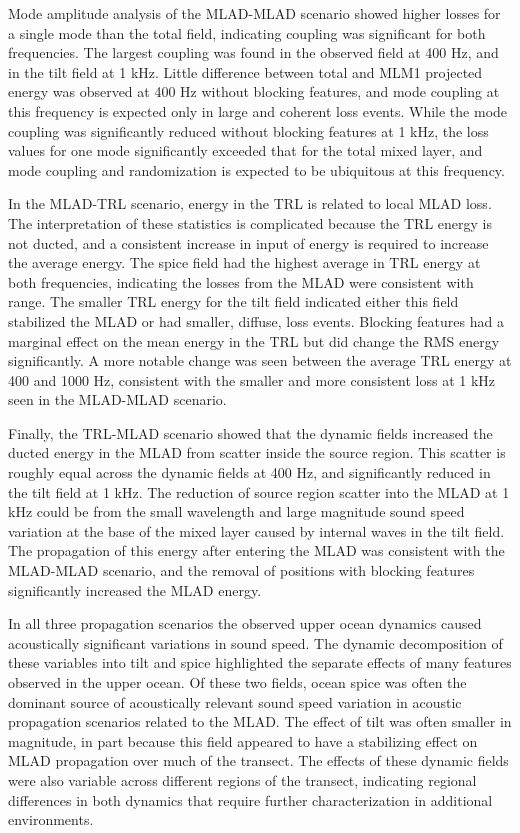 \documentclass[preprint,NumberedRefs]{JASA}
\begin{document}
Mode amplitude analysis of the MLAD-MLAD scenario showed higher losses for a single mode than the total field, indicating coupling was significant for both frequencies. The largest coupling was found in the observed field at 400 Hz, and in the tilt field at 1 kHz. Little difference between total and MLM1 projected energy was observed at 400 Hz without blocking features, and mode coupling at this frequency is expected only in large and coherent loss events. While the mode coupling was significantly reduced without blocking features at 1 kHz, the loss values for one mode significantly exceeded that for the total mixed layer, and mode coupling and randomization is expected to be ubiquitous at this frequency.

In the MLAD-TRL scenario, energy in the TRL is related to local MLAD loss. The interpretation of these statistics is complicated because the TRL energy is not ducted, and a consistent increase in input of energy is required to increase the average energy. The spice field had the highest average in TRL energy at both frequencies, indicating the losses from the MLAD were consistent with range. The smaller TRL energy for the tilt field indicated either this field stabilized the MLAD or had smaller, diffuse, loss events. Blocking features had a marginal effect on the mean energy in the TRL but did change the RMS energy significantly. A more notable change was seen between the average TRL energy at 400 and 1000 Hz, consistent with the smaller and more consistent loss at 1 kHz seen in the MLAD-MLAD scenario.

Finally, the TRL-MLAD scenario showed that the dynamic fields increased the ducted energy in the MLAD from scatter inside the source region. This scatter is roughly equal across the dynamic fields at 400 Hz, and significantly reduced in the tilt field at 1 kHz. The reduction of source region scatter into the MLAD at 1 kHz could be from the small wavelength and large magnitude sound speed variation at the base of the mixed layer caused by internal waves in the tilt field. The propagation of this energy after entering the MLAD was consistent with the MLAD-MLAD scenario, and the removal of positions with blocking features significantly increased the MLAD energy.

In all three propagation scenarios the observed upper ocean dynamics caused acoustically significant variations in sound speed. The dynamic decomposition of these variables into tilt and spice highlighted the separate effects of many features observed in the upper ocean. Of these two fields, ocean spice was often the dominant source of acoustically relevant sound speed variation in acoustic propagation scenarios related to the MLAD. The effect of tilt was often smaller in magnitude, in part because this field appeared to have a stabilizing effect on MLAD propagation over much of the transect. The effects of these dynamic fields were also variable across different regions of the transect, indicating regional differences in both dynamics that require further characterization in additional environments.




\end{document}
